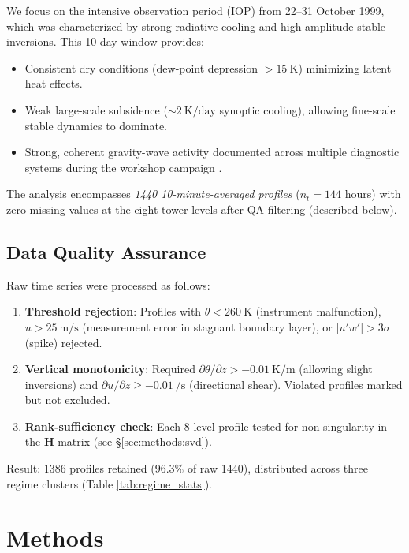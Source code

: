 \documentclass[11pt,a4paper]{article}
\begin{document}
We focus on the intensive observation period (IOP) from 22--31 October 1999, which was characterized by strong radiative cooling and high-amplitude stable inversions. This 10-day window provides:
\begin{itemize}
  \item Consistent dry conditions (dew-point depression $> \SI{15}{\kelvin}$) minimizing latent heat effects.
  \item Weak large-scale subsidence ($\sim \SI{2}{\kelvin\per\text{day}}$ synoptic cooling), allowing fine-scale stable dynamics to dominate.
  \item Strong, coherent gravity-wave activity documented across multiple diagnostic systems during the workshop campaign \citep{Poulos2002}.
\end{itemize}

The analysis encompasses \emph{1440 10-minute-averaged profiles} ($n_t = 144$ hours) with zero missing values at the eight tower levels after QA filtering (described below).

\subsection{Data Quality Assurance}

Raw time series were processed as follows:
\begin{enumerate}
  \item \textbf{Threshold rejection}: Profiles with $\theta < \SI{260}{\kelvin}$ (instrument malfunction), $u > \SI{25}{\meter\per\second}$ (measurement error in stagnant boundary layer), or $|u'w'| > 3\sigma$ (spike) rejected.
  \item \textbf{Vertical monotonicity}: Required $\partial \theta / \partial z > -\SI{0.01}{\kelvin\per\meter}$ (allowing slight inversions) and $\partial u / \partial z \geq -\SI{0.01}{\per\second}$ (directional shear). Violated profiles marked but not excluded.
  \item \textbf{Rank-sufficiency check}: Each 8-level profile tested for non-singularity in the $\mathbf{H}$-matrix (see \S\ref{sec:methods:svd}).
\end{enumerate}

Result: 1386 profiles retained ($96.3\%$ of raw 1440), distributed across three regime clusters (Table \ref{tab:regime_stats}).

\section{Methods}
\label{sec:methods}
\end{document}
